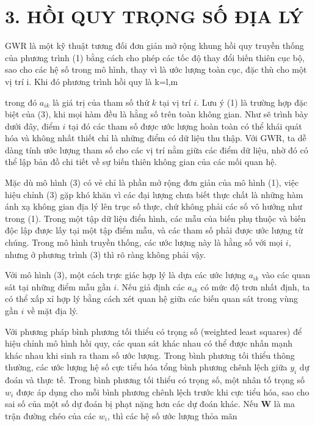 \section{3. HỒI QUY TRỌNG SỐ ĐỊA LÝ}

GWR là một kỹ thuật tương đối đơn giản mở rộng khung hồi quy truyền thống của phương trình (1) bằng cách cho phép các tốc độ thay đổi biến thiên cục bộ, sao cho các hệ số trong mô hình, thay vì là ước lượng toàn cục, đặc thù cho một vị trí i. Khi đó phương trình hồi quy là k=l,m

trong đó \(a_{ik}\) là giá trị của tham số thứ \(k\) tại vị trí \(i\). Lưu ý (1) là trường hợp đặc biệt của (3), khi mọi hàm đều là hằng số trên toàn không gian. Như sẽ trình bày dưới đây, điểm \(i\) tại đó các tham số được ước lượng hoàn toàn có thể khái quát hóa và không nhất thiết chỉ là những điểm có dữ liệu thu thập. Với GWR, ta dễ dàng tính ước lượng tham số cho các vị trí nằm giữa các điểm dữ liệu, nhờ đó có thể lập bản đồ chi tiết về sự biến thiên không gian của các mối quan hệ.

Mặc dù mô hình (3) có vẻ chỉ là phần mở rộng đơn giản của mô hình (1), việc hiệu chỉnh (3) gặp khó khăn vì các đại lượng chưa biết thực chất là những hàm ánh xạ không gian địa lý lên trục số thực, chứ không phải các số vô hướng như trong (1). Trong một tập dữ liệu điển hình, các mẫu của biến phụ thuộc và biến độc lập được lấy tại một tập điểm mẫu, và các tham số phải được ước lượng từ chúng. Trong mô hình truyền thống, các ước lượng này là hằng số với mọi \(i\), nhưng ở phương trình (3) thì rõ ràng không phải vậy.

Với mô hình (3), một cách trực giác hợp lý là dựa các ước lượng \(a_{ik}\) vào các quan sát tại những điểm mẫu gần \(i\). Nếu giả định các \(a_{ik}\) có mức độ trơn nhất định, ta có thể xấp xỉ hợp lý bằng cách xét quan hệ giữa các biến quan sát trong vùng gần \(i\) về mặt địa lý.

Với phương pháp bình phương tối thiểu có trọng số (weighted least squares) để hiệu chỉnh mô hình hồi quy, các quan sát khác nhau có thể được nhấn mạnh khác nhau khi sinh ra tham số ước lượng. Trong bình phương tối thiểu thông thường, các ước lượng hệ số cực tiểu hóa tổng bình phương chênh lệch giữa \(y_i\) dự đoán và thực tế. Trong bình phương tối thiểu có trọng số, một nhân tố trọng số \(w_i\) được áp dụng cho mỗi bình phương chênh lệch trước khi cực tiểu hóa, sao cho sai số của một số dự đoán bị phạt nặng hơn các dự đoán khác. Nếu \(\mathbf{W}\) là ma trận đường chéo của các \(w_i\), thì các hệ số ước lượng thỏa mãn

